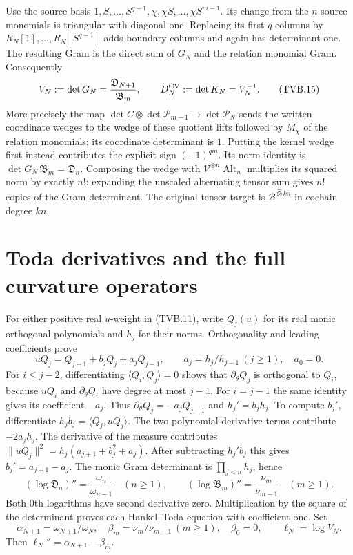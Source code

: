 \documentclass[11pt]{article}
\newcommand{\Alt}{\operatorname{Alt}}
\begin{document}
Use the source basis
$1,S,\ldots,S^{q-1},\chi,\chi S,\ldots,\chi S^{m-1}$.
Its change from the $n$ source monomials is triangular with
diagonal one. Replacing its first $q$ columns by $R_N[1],
\ldots,R_N[S^{q-1}]$ adds boundary columns and again has
determinant one. The resulting Gram is the direct sum of $G_N$
and the relation monomial Gram. Consequently
\[
 V_N:=\det G_N=\frac{\mathfrak D_{N+1}}{\mathfrak B_m},
 \qquad D_N^{\rm CV}:=\det K_N=V_N^{-1}.
 \tag{TVB.15}
\]
More precisely the map
$\det C\otimes\det\mathcal P_{m-1}\to\det\mathcal P_N$
sends the written coordinate wedges to the wedge of these quotient
lifts followed by $M_\chi$ of the relation monomials; its coordinate
determinant is $1$. Putting the kernel wedge first instead contributes
the explicit sign $(-1)^{qm}$. Its norm identity is
$\det G_N\,\mathfrak B_m=\mathfrak D_n$.
Composing the wedge with $\mathcal V^{\otimes n}\Alt_n$
multiplies its squared norm by exactly $n!$: expanding the unscaled
alternating tensor sum gives $n!$ copies of the Gram determinant.
The original tensor target is $\mathscr B^{\widehat\otimes kn}$
in cochain degree $kn$.

\section{Toda derivatives and the full curvature operators}

For either positive real $u$-weight in (TVB.11), write $Q_j(u)$
for its real monic orthogonal polynomials and $h_j$ for their
norms. Orthogonality and leading coefficients prove
\[
 uQ_j=Q_{j+1}+b_jQ_j+a_jQ_{j-1},\qquad
 a_j=h_j/h_{j-1}\ (j\ge1),\quad a_0=0.
\]
For $i\le j-2$, differentiating $\langle Q_i,Q_j\rangle=0$
shows that $\partial_\theta Q_j$ is orthogonal to $Q_i$, because
$uQ_i$ and $\partial_\theta Q_i$ have degree at most $j-1$.
For $i=j-1$ the same identity gives its coefficient $-a_j$.
Thus $\partial_\theta Q_j=-a_jQ_{j-1}$ and $h_j'=b_jh_j$.
To compute $b_j'$, differentiate $h_jb_j=\langle Q_j,uQ_j\rangle$.
The two polynomial derivative terms contribute $-2a_jh_j$.
The derivative of the measure contributes
$\|uQ_j\|^2=h_j(a_{j+1}+b_j^2+a_j)$.
After subtracting $h_j'b_j$ this gives $b_j'=a_{j+1}-a_j$.
The monic Gram determinant is $\prod_{j<n}h_j$, hence
\[
 (\log\mathfrak D_n)''
 =\frac{\omega_n}{\omega_{n-1}}\quad(n\ge1),\qquad
 (\log\mathfrak B_m)''=\frac{\nu_m}{\nu_{m-1}}\quad(m\ge1).
 \tag{TVB.16}
\]
Both $0$th logarithms have second derivative zero.
Multiplication by the square of the determinant proves each
Hankel--Toda equation with coefficient one.
Set
\[
 \alpha_{N+1}=\omega_{N+1}/\omega_N,\quad
 \beta_m=\nu_m/\nu_{m-1}\ (m\ge1),\quad\beta_0=0,
 \qquad\ell_N=\log V_N.
\]
Then $\ell_N''=\alpha_{N+1}-\beta_m$.
\end{document}
